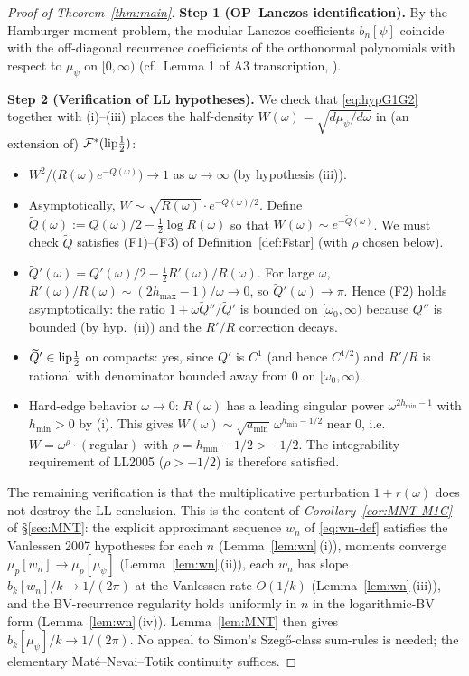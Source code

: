 \documentclass[11pt]{article}
\theoremstyle{definition}
\begin{document}
\begin{proof}[Proof of Theorem~\ref{thm:main}]
\textbf{Step 1 (OP--Lanczos identification).}  By the Hamburger moment
problem, the modular Lanczos coefficients $b_n[\psi]$ coincide with the
off-diagonal recurrence coefficients of the orthonormal polynomials with
respect to $\mu_\psi$ on $[0,\infty)$ (cf.\ Lemma 1 of A3
transcription, \cite[Ch.~1, \S 4]{Akhiezer1965}).

\textbf{Step 2 (Verification of LL hypotheses).}  We check that
\eqref{eq:hypG1G2} together with (i)--(iii) places the half-density
$W(\omega)=\sqrt{d\mu_\psi/d\omega}$ in (an extension of)
$\mathcal{F}^*(\textnormal{lip}\frac{1}{2})$:
\begin{itemize}
\item $W^2/\bigl(R(\omega)e^{-Q(\omega)}\bigr)\to 1$ as $\omega\to\infty$
   (by hypothesis (iii)).
\item Asymptotically, $W\sim \sqrt{R(\omega)}\cdot e^{-Q(\omega)/2}$.
   Define $\widetilde{Q}(\omega):=Q(\omega)/2-\frac{1}{2}\log R(\omega)$
   so that $W(\omega)\sim e^{-\widetilde{Q}(\omega)}$.  We must check
   $\widetilde{Q}$ satisfies (F1)--(F3) of Definition~\ref{def:Fstar}
   (with $\rho$ chosen below).
\item $\widetilde{Q}'(\omega)=Q'(\omega)/2-\frac{1}{2}R'(\omega)/R(\omega)$.
   For large $\omega$, $R'(\omega)/R(\omega)\sim(2h_{\max}-1)/\omega\to 0$,
   so $\widetilde{Q}'(\omega)\to\pi$.  Hence (F2) holds asymptotically: the
   ratio $1+\omega\widetilde{Q}''/\widetilde{Q}'$ is bounded on
   $[\omega_0,\infty)$ because $Q''$ is bounded (by hyp.\ (ii)) and the
   $R'/R$ correction decays.
\item $\widetilde{Q}'\in\textnormal{lip}\frac{1}{2}$ on compacts: yes,
   since $Q'$ is $C^1$ (and hence $C^{1/2}$) and $R'/R$ is rational with
   denominator bounded away from $0$ on $[\omega_0,\infty)$.
\item Hard-edge behavior $\omega\to 0$: $R(\omega)$ has a leading singular
   power $\omega^{2h_{\min}-1}$ with $h_{\min}>0$ by (i).  This gives
   $W(\omega)\sim\sqrt{a_{\min}}\,\omega^{h_{\min}-1/2}$ near $0$, i.e.\
   $W=\omega^\rho\cdot(\text{regular})$ with $\rho=h_{\min}-1/2>-1/2$.  The
   integrability requirement of LL2005 ($\rho>-1/2$) is therefore
   satisfied.
\end{itemize}
The remaining verification is that the multiplicative perturbation
$1+r(\omega)$ does not destroy the LL conclusion.  This is the
content of \emph{Corollary~\ref{cor:MNT-M1C}} of \S\ref{sec:MNT}: the
explicit approximant sequence $w_n$ of \eqref{eq:wn-def} satisfies
the Vanlessen 2007 hypotheses for each $n$ (Lemma~\ref{lem:wn}\,(i)),
moments converge $\mu_p[w_n]\to\mu_p[\mu_\psi]$
(Lemma~\ref{lem:wn}\,(ii)), each $w_n$ has slope $b_k[w_n]/k\to
1/(2\pi)$ at the Vanlessen rate $O(1/k)$
(Lemma~\ref{lem:wn}\,(iii)), and the BV-recurrence regularity holds
uniformly in $n$ in the logarithmic-BV form
(Lemma~\ref{lem:wn}\,(iv)).  Lemma~\ref{lem:MNT} then gives
$b_k[\mu_\psi]/k\to 1/(2\pi)$.  No appeal to Simon's Szeg\H{o}-class
sum-rules \cite{Simon2008} is needed; the elementary
Mat\'e--Nevai--Totik continuity \cite{MNT1985} suffices.


\end{proof}
\end{document}
